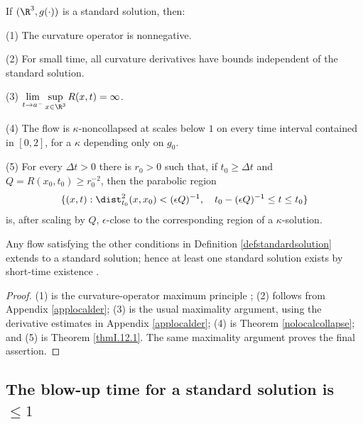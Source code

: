 \begin{lemma}
  \label{lem:kl-standard-solutions-existence-kappa-solutions}

\label{lemstandard0}
If $(\R^3,g(\cdot))$ is a standard solution, then:

(1) The curvature operator is nonnegative.

(2) For small time, all curvature derivatives have bounds independent of the
standard solution.

(3) $\displaystyle\lim_{t\to a^-}\sup_{x\in\R^3}R(x,t)=\infty$.

(4) The flow is $\kappa$-noncollapsed at scales below $1$ on every time
interval contained in $[0,2]$, for a $\kappa$ depending only on $g_0$.

(5) For every $\Delta t>0$ there is $r_0>0$ such that, if $t_0\geq\Delta t$ and
$Q=R(x_0,t_0)\geq r_0^{-2}$, then the parabolic region
\[
\{(x,t):\dist_{t_0}^2(x,x_0)<(\epsilon Q)^{-1},\quad
t_0-(\epsilon Q)^{-1}\leq t\leq t_0\}
\]
is, after scaling by $Q$, $\epsilon$-close to the corresponding region of a
$\kappa$-solution.

Any flow satisfying the other conditions in Definition \ref{defstandardsolution}
extends to a standard solution; hence at least one standard solution exists by
short-time existence \cite[Theorem 1.1]{Shi2}.
\end{lemma}
\begin{proof}
\sketch (1) is the curvature-operator maximum principle \cite[Theorem 4.14]{Shi3};
(2) follows from Appendix \ref{applocalder}; (3) is the usual maximality
argument, using the derivative estimates in Appendix \ref{applocalder}; (4) is
Theorem \ref{nolocalcollapse}; and (5) is Theorem \ref{thmI.12.1}. The same
maximality argument proves the final assertion.
\end{proof}

\subsection{The blow-up time for a standard solution is $\leq 1$}
 \label{claim2}

